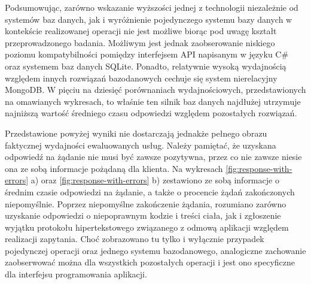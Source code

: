 Podsumowując, zarówno wskazanie wyższości jednej z technologii niezależnie od systemów baz danych, jak i wyróżnienie pojedynczego systemu bazy danych w kontekście realizowanej operacji nie jest możliwe biorąc pod uwagę kształt przeprowadzonego badania. Możliwym jest jednak zaobserowanie niskiego poziomu kompatybilności pomiędzy interfejsem API napisanym w języku C\# oraz systemem baz danych SQLite. Ponadto, relatywnie wysoką wydajnością względem innych rozwiązań bazodanowych cechuje się system nierelacyjny MongoDB. W pięciu na dziesięć porównaniach wydajnościowych, przedstawionych na omawianych wykresach, to właśnie ten silnik baz danych najdłużej utrzymuje najniższą wartość średniego czasu odpowiedzi względem pozostałych rozwiązań.

Przedstawione powyżej wyniki nie dostarczają jednakże pełnego obrazu faktycznej wydajności ewaluowanych usług. Należy pamiętać, że uzyskana odpowiedź na żądanie nie musi być zawsze pozytywna, przez co nie zawsze niesie ona ze sobą informacje pożądaną dla klienta. Na wykresach \ref{fig:response-with-errors} a) oraz \ref{fig:response-with-errors} b) zestawiono ze sobą informacje o średnim czasie odpowiedzi na żądanie, a także o procencie żądań zakończonych niepomyślnie. Poprzez niepomyślne zakończenie żądania, rozumiano zarówno uzyskanie odpowiedzi o niepoprawnym kodzie i treści ciała, jak i zgłoszenie wyjątku protokołu hipertekstowego związanego z odmową aplikacji względem realizacji zapytania. Choć zobrazowano tu tylko i wyłącznie przypadek pojedynczej operacji oraz jednego systemu bazodanowego, analogiczne zachowanie zaobserwować można dla wszystkich pozostałych operacji i jest ono specyficzne dla interfejsu programowania aplikacji. 

